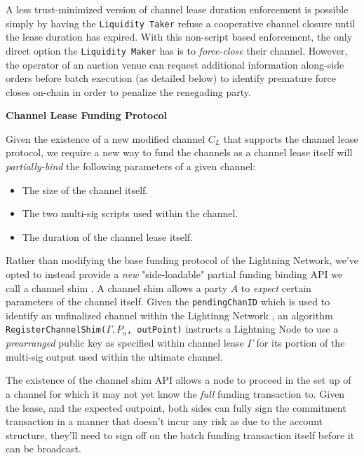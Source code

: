 \documentclass[10pt,a4paper]{article}
\theoremstyle{definition}
\begin{document}
A less trust-minimized version of channel lease duration enforcement is
possible simply by having the \texttt{Liquidity Taker} refuse a cooperative
channel closure until the lease duration has expired. With this non-script
based enforcement, the only direct option the \texttt{Liquidity Maker} has is
to \emph{force-close} their channel. However, the operator of an auction venue
can request additional information along-side orders before batch execution (as
detailed below) to identify premature force closes on-chain in order to
penalize the renegading party.


\begin{center}
    \textbf{Channel Lease Funding Protocol}
\end{center}

Given the existence of a new modified channel $C_{L}$ that supports the channel
lease protocol, we require a new way to fund the channels as a channel
lease itself will \emph{partially-bind} the following parameters of a given
channel:
\begin{itemize}
    \item The size of the channel itself.
    \item The two multi-sig scripts used within the channel.
    \item The duration of the channel lease itself.
\end{itemize}

Rather than modifying the base funding protocol of the Lightning Network, we've
opted to instead provide a \emph{new} "side-loadable" partial funding binding
API we call a channel shim \cite{chanShim}. A channel shim allows a party $A$ to
\emph{expect} certain parameters of the channel itself. Given the
\texttt{pendingChanID} which is used to identify an unfinalized channel within
the Lightinng Network \cite{bolt2}, an algorithm \texttt{RegisterChannelShim($\Gamma,
P_{a}$, outPoint)} instructs a Lightning Node to use a \emph{prearranged} public key as
specified within channel lease $\Gamma$ for its portion of the multi-sig output
used within the ultimate channel.

The existence of the channel shim API allows a node to proceed in the set up of
a channel for which it may not yet know the \emph{full} funding transaction to.
Given the lease, and the expected outpoint, both sides can fully sign the
commitment transaction in a manner that doesn't incur any risk as due to the
account structure, they'll need to sign off on the batch funding transaction
itself before it can be broadcast.
\end{document}
